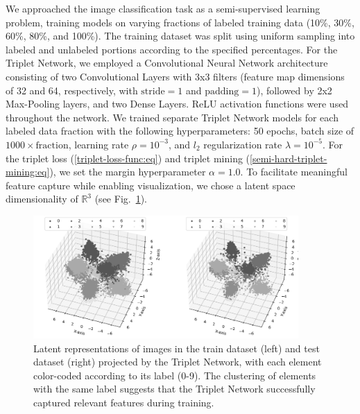 We approached the image classification task as a semi-supervised learning problem, training models on varying fractions of labeled training data (10\%, 30\%, 60\%, 80\%, and 100\%). The training dataset was split using uniform sampling into labeled and unlabeled portions according to the specified percentages. For the Triplet Network, we employed a Convolutional Neural Network architecture consisting of two Convolutional Layers with 3x3 filters (feature map dimensions of 32 and 64, respectively, with $\text{stride}=1$ and $\text{padding}=1$), followed by 2x2 Max-Pooling layers, and two Dense Layers. ReLU activation functions were used throughout the network. We trained separate Triplet Network models for each labeled data fraction with the following hyperparameters: 50 epochs, batch size of $1000 \times \text{fraction}$, learning rate $\rho = 10^{-3}$, and $l_2$ regularization rate $\lambda = 10^{-5}$. For the triplet loss (\ref{triplet-loss-func:eq}) and triplet mining (\ref{semi-hard-triplet-mining:eq}), we set the margin hyperparameter $\alpha = 1.0$. To facilitate meaningful feature capture while enabling visualization, we chose a latent space dimensionality of $\mathbb{R}^3$ (see Fig.~\ref{latent-space:fig}).

\begin{figure}
    \centering
    \includegraphics[width=0.9\textwidth]{figures/latent_space.png}
    \caption{Latent representations of images in the train dataset (left) and test dataset (right) projected by the Triplet Network, with each element color-coded according to its label (0-9). The clustering of elements with the same label suggests that the Triplet Network successfully captured relevant features during training.}
    \label{latent-space:fig}
\end{figure}

